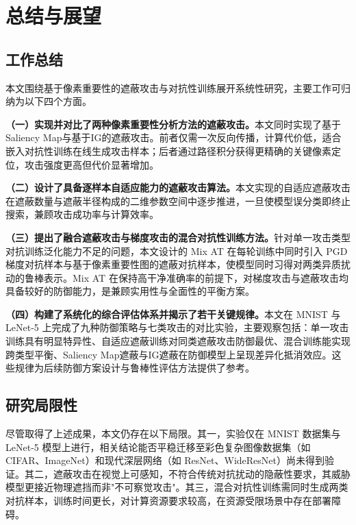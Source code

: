 
\chapter{总结与展望} \label{chpt:conclusion}

\section{工作总结}

本文围绕基于像素重要性的遮蔽攻击与对抗性训练展开系统性研究，主要工作可归纳为以下四个方面。

\textbf{（一）实现并对比了两种像素重要性分析方法的遮蔽攻击。}本文同时实现了基于Saliency Map与基于IG的遮蔽攻击。前者仅需一次反向传播，计算代价低，适合嵌入对抗性训练在线生成攻击样本；后者通过路径积分获得更精确的关键像素定位，攻击强度更高但代价显著增加。

\textbf{（二）设计了具备逐样本自适应能力的遮蔽攻击算法。}本文实现的自适应遮蔽攻击在遮蔽数量与遮蔽半径构成的二维参数空间中逐步推进，一旦使模型误分类即终止搜索，兼顾攻击成功率与计算效率。

\textbf{（三）提出了融合遮蔽攻击与梯度攻击的混合对抗性训练方法。}针对单一攻击类型对抗训练泛化能力不足的问题，本文设计的 Mix AT 在每轮训练中同时引入 PGD 梯度对抗样本与基于像素重要性图的遮蔽对抗样本，使模型同时习得对两类异质扰动的鲁棒表示。Mix AT 在保持高干净准确率的前提下，对梯度攻击与遮蔽攻击均具备较好的防御能力，是兼顾实用性与全面性的平衡方案。

\textbf{（四）构建了系统化的综合评估体系并揭示了若干关键规律。}本文在 MNIST 与 LeNet-5 上完成了九种防御策略与七类攻击的对比实验，主要观察包括：单一攻击训练具有明显特异性、自适应遮蔽训练对同类遮蔽攻击防御最优、混合训练能实现跨类型平衡、Saliency Map遮蔽与IG遮蔽在防御模型上呈现差异化抵消效应。这些规律为后续防御方案设计与鲁棒性评估方法提供了参考。

\section{研究局限性}

尽管取得了上述成果，本文仍存在以下局限。其一，实验仅在 MNIST 数据集与 LeNet-5 模型上进行，相关结论能否平稳迁移至彩色复杂图像数据集（如 CIFAR、ImageNet）和现代深层网络（如 ResNet、WideResNet）尚未得到验证。其二，遮蔽攻击在视觉上可感知，不符合传统对抗扰动的隐蔽性要求，其威胁模型更接近物理遮挡而非"不可察觉攻击"。其三，混合对抗性训练需同时生成两类对抗样本，训练时间更长，对计算资源要求较高，在资源受限场景中存在部署障碍。

